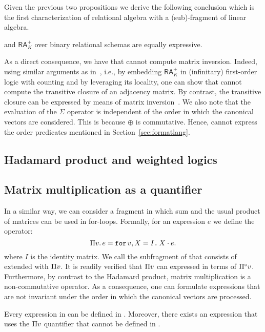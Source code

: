 Given the previous two propositions we derive the following conclusion which is the first characterization of relational algebra with a (sub)-fragment of linear algebra.
\begin{corollary}
	\langsum and $\mathsf{RA}_{K}^+$  over binary relational schemas are equally expressive. 
\end{corollary}

As a direct consequence, we have that \langsum cannot compute matrix inversion. Indeed, using similar arguments as
in~\cite{matlang-journal}, i.e., by embedding $\mathsf{RA}_{K}^+$  in (infinitary) first-order logic with counting and by leveraging its locality, one can show that \langsum cannot compute the transitive closure of an adjacency matrix. By contrast, the transitive closure can be expressed by means of matrix inversion~\cite{matlang-journal}. We also note that the evaluation of the $\Sigma$ operator is
independent of the order in which the canonical vectors are considered. This is because $\oplus$ is commutative.
Hence, \langsum cannot express the order predicates mentioned in Section~\ref{sec:formatlang}.



\subsection{Hadamard product and weighted logics}\label{subsec:langprod}




\subsection{Matrix multiplication as a quantifier}\label{subsec:langlinear}
In a similar way, we can consider a fragment in which sum and the usual product of matrices can be used
in for-loops. Formally, for an expression $e$ we define the operator:
$$
\Pi v.\,  e=\texttt{for}\, v,X = I \texttt{.}\, X\cdot e.
$$
where $I$ is the identity matrix. We call \langmprod the subfragment of \langfor that consists of \langsum extended with $\Pi v$. It is readily verified that  $\Pi v$ can expressed in terms of $\Pi^{\circ} v$.
Furthermore, by contrast to the Hadamard product, matrix multiplication is a non-commutative operator. As a consequence, one can formulate expressions that are not invariant under the order in which the canonical vectors
are processed.

\begin{proposition}
	Every expression in \langprod can be defined in \langmprod. Moreover, there exists an expression that uses the $\Pi v$ quantifier that cannot be defined in \langprod.
\end{proposition}

